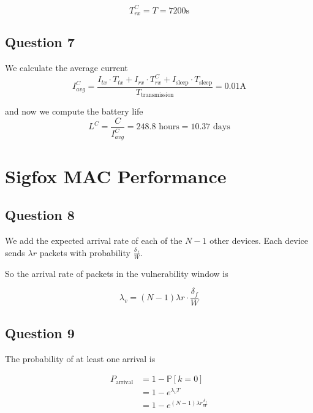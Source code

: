 \documentclass[]{article}
\begin{document}
	\begin{equation}
		T_{rx}^C = T = 7200 \mathrm{s}
	\end{equation}
	
	\subsection*{Question 7}
	
	We calculate the average current
	\begin{equation}
		I_{avg}^C = \frac{I_{tx} \cdot T_{tx} + I_{rx} \cdot T_{rx}^C + I_{\text{sleep}} \cdot T_{\text{sleep}}}{T_{\text{transmission}}} = 0.01\mathrm{A}
	\end{equation}
	
	and now we compute the battery life
	\begin{equation}
		L^C = \frac{C}{I_{avg}^C} = 248.8 \text{ hours} = 10.37 \text{ days}
	\end{equation}
	
	\section{Sigfox MAC Performance}
	
	\subsection*{Question 8}
	
	We add the expected arrival rate of each of the $N-1$ other devices. Each device sends $\lambda r$ packets with probability $\frac{\delta_f}{W}$.
	
	So the arrival rate of packets in the vulnerability window is
	
	\begin{equation}
		\lambda_v = (N-1)\lambda r \cdot \frac{\delta_f}{W}
	\end{equation}
	
	\subsection*{Question 9}
	
	The probability of at least one arrival is 
	
	\begin{align}
		P_{\text{arrival}} &= 1 - \mathbb{P}[k = 0] \\
						   &= 1 - e^{\lambda_v T} \\
						   &= 1 - e^{(N-1)\lambda r \frac{\delta_f}{W}}
	\end{align}
	
\end{document}
